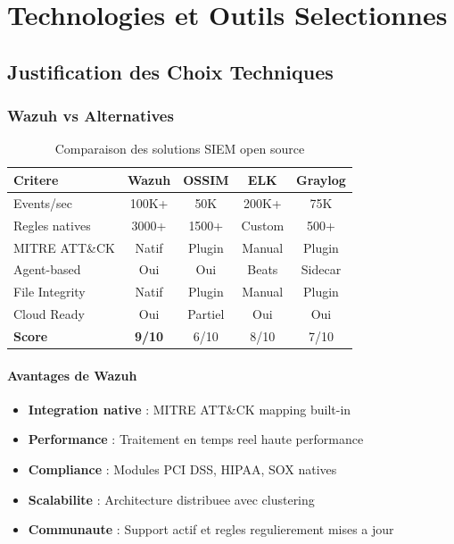 \section{Technologies et Outils Selectionnes}

\subsection{Justification des Choix Techniques}

\subsubsection{Wazuh vs Alternatives}

\begin{table}[H]
    \centering
    \caption{Comparaison des solutions SIEM open source}
    \begin{tabular}{|l|c|c|c|c|}
        \hline
        \textbf{Critere} & \textbf{Wazuh} & \textbf{OSSIM} & \textbf{ELK} & \textbf{Graylog} \\
        \hline
        Events/sec       & 100K+          & 50K            & 200K+        & 75K              \\
        \hline
        Regles natives   & 3000+          & 1500+          & Custom       & 500+             \\
        \hline
        MITRE ATT\&CK    & Natif          & Plugin         & Manual       & Plugin           \\
        \hline
        Agent-based      & Oui            & Oui            & Beats        & Sidecar          \\
        \hline
        File Integrity   & Natif          & Plugin         & Manual       & Plugin           \\
        \hline
        Cloud Ready      & Oui            & Partiel        & Oui          & Oui              \\
        \hline
        \textbf{Score}   & \textbf{9/10}  & 6/10           & 8/10         & 7/10             \\
        \hline
    \end{tabular}
\end{table}

\paragraph{Avantages de Wazuh}
\begin{itemize}
    \item \textbf{Integration native} : MITRE ATT\&CK mapping built-in
    \item \textbf{Performance} : Traitement en temps reel haute performance
    \item \textbf{Compliance} : Modules PCI DSS, HIPAA, SOX natives
    \item \textbf{Scalabilite} : Architecture distribuee avec clustering
    \item \textbf{Communaute} : Support actif et regles regulierement mises a jour
\end{itemize}

